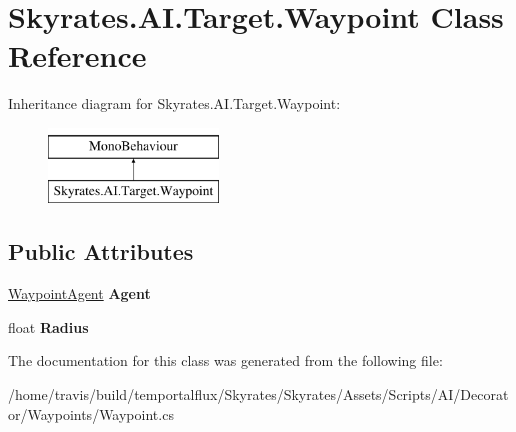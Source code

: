 \hypertarget{class_skyrates_1_1_a_i_1_1_target_1_1_waypoint}{\section{Skyrates.\-A\-I.\-Target.\-Waypoint Class Reference}
\label{class_skyrates_1_1_a_i_1_1_target_1_1_waypoint}
}
Inheritance diagram for Skyrates.\-A\-I.\-Target.\-Waypoint\-:\begin{figure}[H]
\begin{center}
\leavevmode
\includegraphics[height=2.000000cm]{class_skyrates_1_1_a_i_1_1_target_1_1_waypoint}
\end{center}
\end{figure}
\subsection*{Public Attributes}
\begin{DoxyCompactItemize}
\item 
\hypertarget{class_skyrates_1_1_a_i_1_1_target_1_1_waypoint_a7b403b2ad64d84024e5fe8525720f272}{\hyperlink{class_skyrates_1_1_a_i_1_1_target_1_1_waypoint_agent}{Waypoint\-Agent} {\bfseries Agent}}\label{class_skyrates_1_1_a_i_1_1_target_1_1_waypoint_a7b403b2ad64d84024e5fe8525720f272}

\item 
\hypertarget{class_skyrates_1_1_a_i_1_1_target_1_1_waypoint_a6a8cfa9cae3d62cdaecd8caa8309b81b}{float {\bfseries Radius}}\label{class_skyrates_1_1_a_i_1_1_target_1_1_waypoint_a6a8cfa9cae3d62cdaecd8caa8309b81b}

\end{DoxyCompactItemize}


The documentation for this class was generated from the following file\-:\begin{DoxyCompactItemize}
\item 
/home/travis/build/temportalflux/\-Skyrates/\-Skyrates/\-Assets/\-Scripts/\-A\-I/\-Decorator/\-Waypoints/Waypoint.\-cs\end{DoxyCompactItemize}
